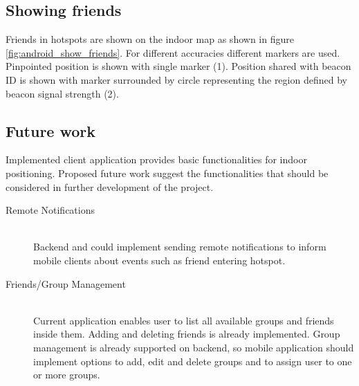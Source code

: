 \subsection{Showing friends}
Friends in hotspots are shown on the indoor map as shown in figure \ref{fig:android_show_friends}. For different accuracies different markers are used. Pinpointed position is shown with single marker (1). Position shared with beacon ID is shown with marker surrounded by circle representing the region defined by beacon signal strength (2). 

\subsection{Future work}
Implemented client application provides basic functionalities for indoor positioning. Proposed future work suggest the functionalities that should be considered in further development of the project.

\begin{description}
  \item[Remote Notifications] \hfill \\
  Backend and could implement sending remote notifications to inform mobile clients about events such as friend entering hotspot.
  \item[Friends/Group Management] \hfill \\
  Current application enables user to list all available groups and friends inside them. Adding and deleting friends is already implemented. Group management is already supported on backend, so mobile application should implement options to add, edit and delete groups and to assign user to one or more groups.

\end{description}	